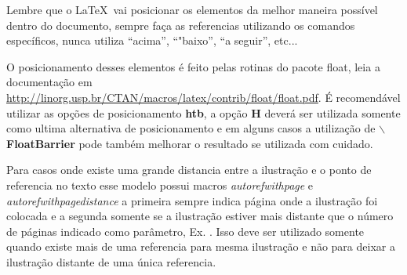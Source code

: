 Lembre que o \LaTeX \  vai posicionar os elementos  da melhor maneira possível dentro do documento, sempre faça as referencias utilizando os comandos específicos, nunca utiliza \enquote{acima}, \enquote{"baixo}, \enquote{a seguir}, etc... 

O posicionamento desses elementos é feito pelas rotinas do pacote float, leia a documentação em  \url{http://linorg.usp.br/CTAN/macros/latex/contrib/float/float.pdf}. É recomendável utilizar as opções de posicionamento \textbf{htb}, a opção \textbf{H} deverá ser utilizada somente como ultima alternativa de posicionamento e em alguns casos a utilização de \textbf{$\backslash$FloatBarrier} pode também melhorar o resultado se utilizada com cuidado.


Para casos onde existe uma grande distancia entre a ilustração e o ponto de referencia no texto esse modelo possui macros \emph{autorefwithpage} e \emph{autorefwithpagedistance} a primeira sempre indica página onde a ilustração foi colocada e a segunda somente se a ilustração estiver mais distante que o número de páginas indicado como parâmetro, Ex. . Isso deve ser utilizado somente quando existe mais de uma referencia para mesma ilustração e não para deixar a ilustração distante de uma única referencia.











